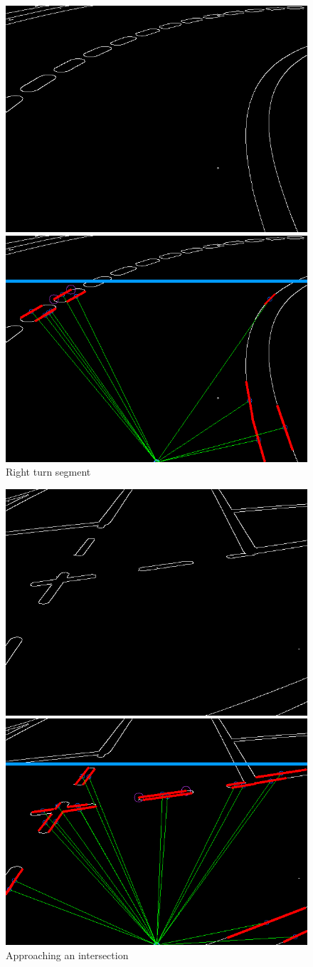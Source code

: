 \documentclass [10pt]{article}
\begin{document}
\begin{figure}
\centering
\begin{subfig}
  \centering
  \includegraphics[width=.4\linewidth]{figures/right_c.png}
\end{subfig}%
\begin{subfig}
  \centering
  \includegraphics[width=.4\linewidth]{figures/right_h.png}
\end{subfig}
\caption{Right turn segment}
\label{fig:Fig4}
\end{figure}

\begin{figure}
\centering
\begin{subfig}
  \centering
  \includegraphics[width=.4\linewidth]{figures/intersection2_c.png}
\end{subfig}%
\begin{subfig}
  \centering
  \includegraphics[width=.4\linewidth]{figures/intersection2_h.png}
\end{subfig}
\caption{Approaching an intersection}
\label{fig:Fig5}
\end{figure}
\end{document}
